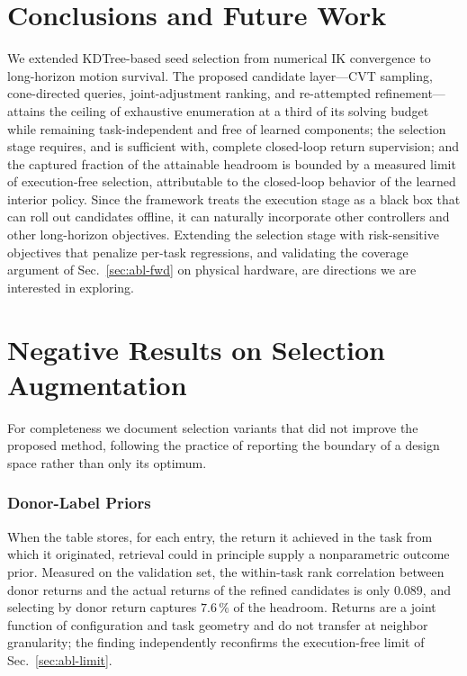 \documentclass[journal]{IEEEtran}
\begin{document}
\section{Conclusions and Future Work}
We extended KDTree-based seed selection from numerical IK convergence to
long-horizon motion survival. The proposed candidate layer---CVT
sampling, cone-directed queries, joint-adjustment ranking, and
re-attempted refinement---attains the ceiling of exhaustive enumeration
at a third of its solving budget while remaining task-independent and
free of learned components; the selection stage requires, and is
sufficient with, complete closed-loop return supervision; and the
captured fraction of the attainable headroom is bounded by a measured
limit of execution-free selection, attributable to the closed-loop
behavior of the learned interior policy. Since the framework treats the
execution stage as a black box that can roll out candidates offline, it
can naturally incorporate other controllers and other long-horizon
objectives. Extending the selection stage with risk-sensitive objectives
that penalize per-task regressions, and validating the coverage argument
of Sec.~\ref{sec:abl-fwd} on physical hardware, are directions we are
interested in exploring.

\appendices

\section{Negative Results on Selection Augmentation}
\label{app:negative}
For completeness we document selection variants that did not improve the
proposed method, following the practice of reporting the boundary of a
design space rather than only its optimum.

\subsubsection*{Donor-Label Priors}
When the table stores, for each entry, the return it achieved in the
task from which it originated, retrieval could in principle supply a
nonparametric outcome prior. Measured on the validation set, the
within-task rank correlation between donor returns and the actual
returns of the refined candidates is only $0.089$, and selecting by
donor return captures $7.6\,\%$ of the headroom. Returns are a joint
function of configuration and task geometry and do not transfer at
neighbor granularity; the finding independently reconfirms the
execution-free limit of Sec.~\ref{sec:abl-limit}.
\end{document}
